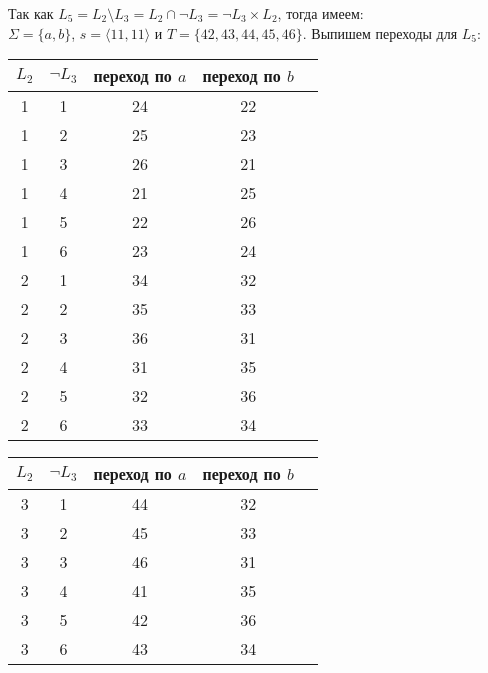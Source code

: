 \documentclass{article}
\begin{document}
\begin{enumerate}
\begin{center}
        \end{center}
        
        Так как \(L_5= L_2 \setminus L_3 = L_2 \cap \neg L_3 = \neg L_3 \times L_2\), тогда имеем:\\ \(\Sigma=\{a,b\}\), \(s=\langle11,11\rangle\) и \(T=\{42, 43, 44, 45, 46\}\). Выпишем переходы для \(L_5\): 
        \begin{center}
            \begin{tabular}{ |c|c|c|c|c| } 
                \hline
                \(L_2\) & \(\neg L_3\) & переход по \(a\) & переход по \(b\) \\
                \hline\hline
                1 & 1 & 24 & 22 \\
                \hline 
                1 & 2 & 25 & 23 \\
                \hline
                1 & 3 & 26 & 21 \\
                \hline
                1 & 4 & 21 & 25 \\
                \hline
                1 & 5 & 22 & 26 \\
                \hline
                1 & 6 & 23 & 24 \\
                \hline\hline
                
                2 & 1 & 34 & 32 \\
                \hline
                2 & 2 & 35 & 33 \\
                \hline
                2 & 3 & 36 & 31 \\
                \hline
                2 & 4 & 31 & 35 \\
                \hline
                2 & 5 & 32 & 36 \\
                \hline
                2 & 6 & 33 & 34 \\
                \hline
            \end{tabular} \:\:
            \begin{tabular}{ |c|c|c|c|c| } 
                \hline
                \(L_2\) & \(\neg L_3\) & переход по \(a\) & переход по \(b\) \\
                \hline\hline
                3 & 1 & 44 & 32 \\
                \hline
                3 & 2 & 45 & 33 \\
                \hline
                3 & 3 & 46 & 31 \\
                \hline
                3 & 4 & 41 & 35 \\
                \hline
                3 & 5 & 42 & 36 \\
                \hline
                3 & 6 & 43 & 34 \\
                \hline\hline
                

\end{tabular}
\end{center}
\end{enumerate}
\end{document}

